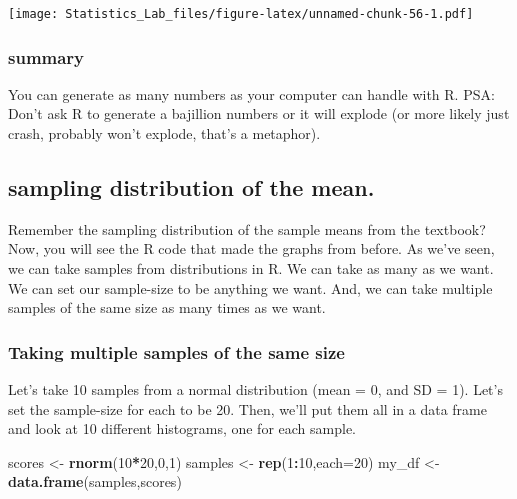 \documentclass[
]{book}
\newenvironment{Shaded}{\begin{snugshade}}{\end{snugshade}}
\newcommand{\AttributeTok}[1]{\textcolor[rgb]{0.13,0.29,0.53}{#1}}
\newcommand{\DecValTok}[1]{\textcolor[rgb]{0.00,0.00,0.81}{#1}}
\newcommand{\FunctionTok}[1]{\textcolor[rgb]{0.13,0.29,0.53}{\textbf{#1}}}
\newcommand{\NormalTok}[1]{#1}
\newcommand{\OtherTok}[1]{\textcolor[rgb]{0.56,0.35,0.01}{#1}}
\newcommand{\SpecialCharTok}[1]{\textcolor[rgb]{0.81,0.36,0.00}{\textbf{#1}}}
\begin{document}
\texttt{[image: Statistics\_Lab\_files/figure-latex/unnamed-chunk-56-1.pdf]}

\hypertarget{summary}{%
\subsubsection{summary}\label{summary}}

You can generate as many numbers as your computer can handle with R.
PSA: Don't ask R to generate a bajillion numbers or it will explode (or
more likely just crash, probably won't explode, that's a metaphor).

\hypertarget{sampling-distribution-of-the-mean.}{%
\subsection{sampling distribution of the mean.}\label{sampling-distribution-of-the-mean.}}

Remember the sampling distribution of the sample means from the
textbook? Now, you will see the R code that made the graphs from before.
As we've seen, we can take samples from distributions in R. We can take
as many as we want. We can set our sample-size to be anything we want.
And, we can take multiple samples of the same size as many times as we
want.

\hypertarget{taking-multiple-samples-of-the-same-size}{%
\subsubsection{Taking multiple samples of the same size}\label{taking-multiple-samples-of-the-same-size}}

Let's take 10 samples from a normal distribution (mean = 0, and SD = 1).
Let's set the sample-size for each to be 20. Then, we'll put them all in
a data frame and look at 10 different histograms, one for each sample.

\begin{Shaded}
\begin{Highlighting}[]
\NormalTok{scores }\OtherTok{\textless{}{-}} \FunctionTok{rnorm}\NormalTok{(}\DecValTok{10}\SpecialCharTok{*}\DecValTok{20}\NormalTok{,}\DecValTok{0}\NormalTok{,}\DecValTok{1}\NormalTok{)}
\NormalTok{samples }\OtherTok{\textless{}{-}} \FunctionTok{rep}\NormalTok{(}\DecValTok{1}\SpecialCharTok{:}\DecValTok{10}\NormalTok{,}\AttributeTok{each=}\DecValTok{20}\NormalTok{)}
\NormalTok{my\_df }\OtherTok{\textless{}{-}} \FunctionTok{data.frame}\NormalTok{(samples,scores)}
\end{Highlighting}
\end{Shaded}
\end{document}
